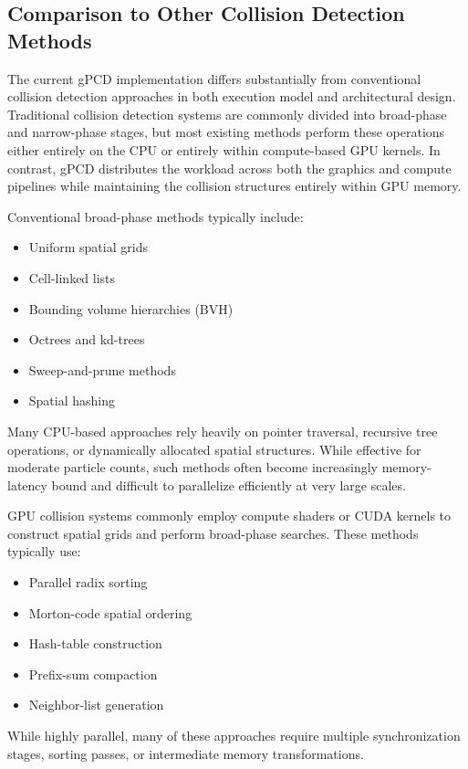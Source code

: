 \documentclass{article}
\begin{document}
\subsection{Comparison to Other Collision Detection Methods}

The current gPCD implementation differs substantially from conventional collision detection approaches in both execution model and architectural design. Traditional collision detection systems are commonly divided into broad-phase and narrow-phase stages, but most existing methods perform these operations either entirely on the CPU or entirely within compute-based GPU kernels. In contrast, gPCD distributes the workload across both the graphics and compute pipelines while maintaining the collision structures entirely within GPU memory.

Conventional broad-phase methods typically include:

\begin{itemize}
    \item Uniform spatial grids
    \item Cell-linked lists
    \item Bounding volume hierarchies (BVH)
    \item Octrees and kd-trees
    \item Sweep-and-prune methods
    \item Spatial hashing
\end{itemize}

Many CPU-based approaches rely heavily on pointer traversal, recursive tree operations, or dynamically allocated spatial structures. While effective for moderate particle counts, such methods often become increasingly memory-latency bound and difficult to parallelize efficiently at very large scales.

GPU collision systems commonly employ compute shaders or CUDA kernels to construct spatial grids and perform broad-phase searches. These methods typically use:

\begin{itemize}
    \item Parallel radix sorting
    \item Morton-code spatial ordering
    \item Hash-table construction
    \item Prefix-sum compaction
    \item Neighbor-list generation
\end{itemize}

While highly parallel, many of these approaches require multiple synchronization stages, sorting passes, or intermediate memory transformations.
\end{document}
